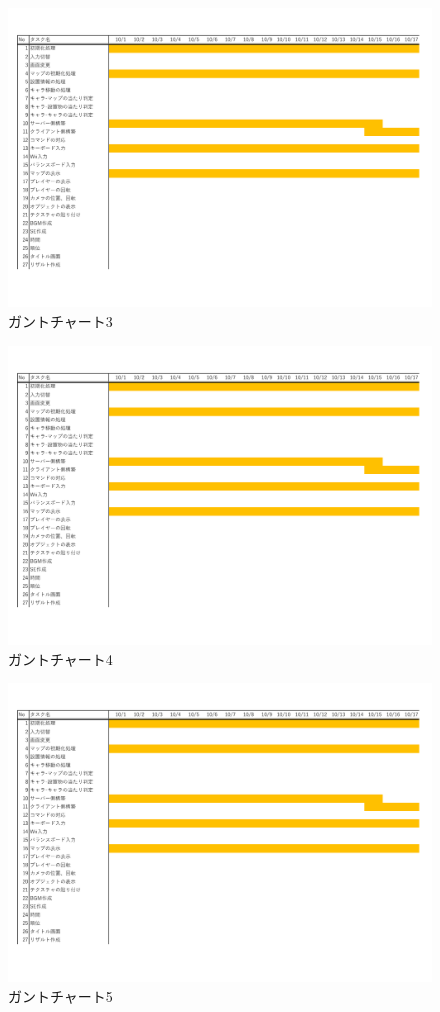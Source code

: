 \documentclass{jarticle}
\begin{document}
\begin{figure}[H]
    \centering
    \label{table:gunt1}
    \caption{ガントチャート3}
    \includegraphics[scale=0.5, page=3]{gunt.pdf}
\end{figure}
\begin{figure}[H]
    \centering
    \label{table:gunt1}
    \caption{ガントチャート4}
    \includegraphics[scale=0.5, page=4]{gunt.pdf}
\end{figure}
\begin{figure}[H]
    \centering
    \label{table:gunt1}
    \caption{ガントチャート5}
    \includegraphics[scale=0.5, page=5]{gunt.pdf}
\end{figure}
\end{document}
